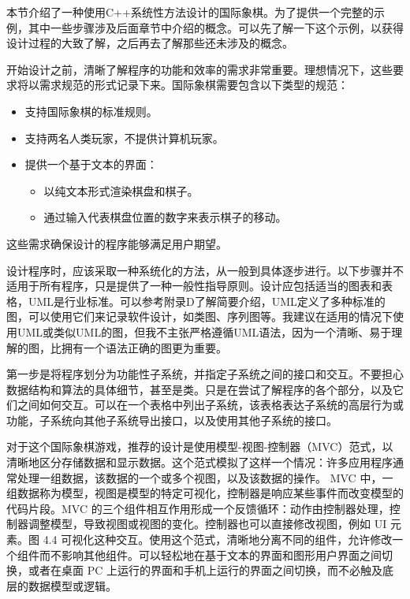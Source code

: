 
本节介绍了一种使用C++系统性方法设计的国际象棋。为了提供一个完整的示例，其中一些步骤涉及后面章节中介绍的概念。可以先了解一下这个示例，以获得设计过程的大致了解，之后再去了解那些还未涉及的概念。


开始设计之前，清晰了解程序的功能和效率的需求非常重要。理想情况下，这些要求将以需求规范的形式记录下来。国际象棋需要包含以下类型的规范：

\begin{itemize}
\item
支持国际象棋的标准规则。

\item
支持两名人类玩家，不提供计算机玩家。

\item
提供一个基于文本的界面：
\begin{itemize}
\item
以纯文本形式渲染棋盘和棋子。

\item
通过输入代表棋盘位置的数字来表示棋子的移动。
\end{itemize}
\end{itemize}

这些需求确保设计的程序能够满足用户期望。


设计程序时，应该采取一种系统化的方法，从一般到具体逐步进行。以下步骤并不适用于所有程序，只是提供了一种一般性指导原则。设计应包括适当的图表和表格，UML是行业标准。可以参考附录D了解简要介绍，UML定义了多种标准的图，可以使用它们来记录软件设计，如类图、序列图等。我建议在适用的情况下使用UML或类似UML的图，但我不主张严格遵循UML语法，因为一个清晰、易于理解的图，比拥有一个语法正确的图更为重要。


第一步是将程序划分为功能性子系统，并指定子系统之间的接口和交互。不要担心数据结构和算法的具体细节，甚至是类。只是在尝试了解程序的各个部分，以及它们之间如何交互。可以在一个表格中列出子系统，该表格表达子系统的高层行为或功能，子系统向其他子系统导出接口，以及使用其他子系统的接口。

对于这个国际象棋游戏，推荐的设计是使用模型-视图-控制器（MVC）范式，以清晰地区分存储数据和显示数据。这个范式模拟了这样一个情况：许多应用程序通常处理一组数据，该数据的一个或多个视图，以及该数据的操作。 MVC 中，一组数据称为模型，视图是模型的特定可视化，控制器是响应某些事件而改变模型的代码片段。MVC 的三个组件相互作用形成一个反馈循环：动作由控制器处理，控制器调整模型，导致视图或视图的变化。控制器也可以直接修改视图，例如 UI 元素。图 4.4 可视化这种交互。使用这个范式，清晰地分离不同的组件，允许修改一个组件而不影响其他组件。可以轻松地在基于文本的界面和图形用户界面之间切换，或者在桌面 PC 上运行的界面和手机上运行的界面之间切换，而不必触及底层的数据模型或逻辑。


